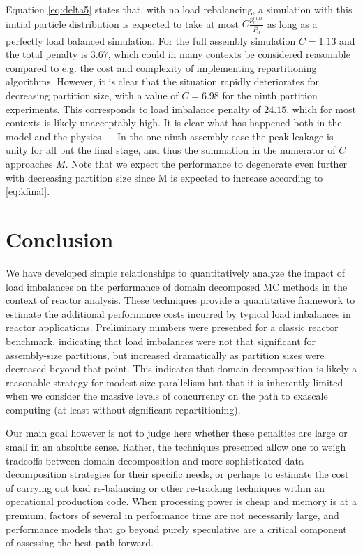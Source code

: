 Equation \eqref{eq:delta5} states that, with no load rebalancing, a simulation
with this initial particle distribution is expected to take at most
$C\frac{p_0^{max}}{\overline{P_0}}$ as long as a perfectly load balanced
simulation. For the full assembly simulation $C=1.13$ and the total penalty is
$3.67$, which could in many contexts be considered reasonable compared to
e.g. the cost and complexity of implementing repartitioning algorithms. However,
it is clear that the situation rapidly deteriorates for decreasing partition
size, with a value of $C=6.98$ for the ninth partition experiments. This
corresponds to load imbalance penalty of $24.15$, which for most contexts is
likely unacceptably high. It is clear what has happened both in the model and
the physics --- In the one-ninth assembly case the peak leakage is unity for all
but the final stage, and thus the summation in the numerator of $C$ approaches
$M$. Note that we expect the performance to degenerate even further with
decreasing partition size since M is expected to increase according to
\eqref{eq:kfinal}.

\section{Conclusion}
We have developed simple relationships to quantitatively analyze the impact of
load imbalances on the performance of domain decomposed MC methods in the
context of reactor analysis. These techniques provide a quantitative framework
to estimate the additional performance costs incurred by typical load imbalances
in reactor applications. Preliminary numbers were presented for a classic
reactor benchmark, indicating that load imbalances were not that significant for
assembly-size partitions, but increased dramatically as partition sizes were
decreased beyond that point. This indicates that domain decomposition is likely
a reasonable strategy for modest-size parallelism but that it is inherently
limited when we consider the massive levels of concurrency on the path to
exascale computing (at least without significant repartitioning).

Our main goal however is not to judge here whether these penalties are large or
small in an absolute sense.  Rather, the techniques presented allow one to weigh
tradeoffs between domain decomposition and more sophisticated data decomposition
strategies for their specific needs, or perhaps to estimate the cost of carrying
out load re-balancing or other re-tracking techniques within an operational
production code. When processing power is cheap and memory is at a premium,
factors of several in performance time are not necessarily large, and
performance models that go beyond purely speculative are a critical component of
assessing the best path forward.
